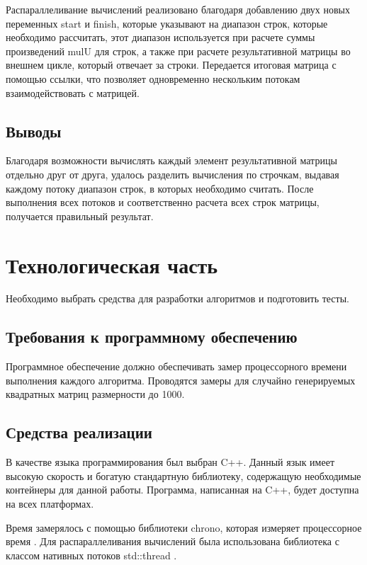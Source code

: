 \documentclass[a4paper,12pt]{article}
\begin{document}
Распараллеливание вычислений реализовано благодаря добавлению двух новых переменных
{\ttfamily start} и {\ttfamily finish}, которые указывают на диапазон строк, которые
необходимо рассчитать, этот диапазон используется при расчете суммы произведений
{\ttfamily mulU} для строк, а также при расчете результативной матрицы во внешнем цикле, который
отвечает за строки. Передается итоговая матрица с помощью ссылки, что позволяет
одновременно нескольким потокам взаимодействовать с матрицей.

\subsection{Выводы}

Благодаря возможности вычислять каждый элемент результативной матрицы отдельно друг от друга,
удалось разделить вычисления по строчкам, выдавая каждому потоку диапазон строк, в которых
необходимо считать. После выполнения всех потоков и соответственно расчета всех строк матрицы,
получается правильный результат.

\newpage
\section{Технологическая часть}

Необходимо выбрать средства для разработки алгоритмов и подготовить тесты.

\subsection{Требования к программному обеспечению}

Программное обеспечение должно обеспечивать замер процессорного времени выполнения
каждого алгоритма. Проводятся замеры для случайно генерируемых квадратных матриц
размерности до 1000.

\subsection{Средства реализации}

В качестве языка программирования был выбран {\ttfamily C++}.
Данный язык имеет высокую скорость и богатую стандартную библиотеку,
содержащую необходимые контейнеры для данной работы. Программа, написанная на
{\ttfamily C++}, будет доступна на всех платформах.

Время замерялось с помощью библиотеки {\ttfamily chrono}, которая измеряет
процессорное время \cite{chrono}. Для распараллеливания вычислений была
использована библиотека с классом нативных потоков
{\ttfamily std::thread} \cite{thread}.
\end{document}
